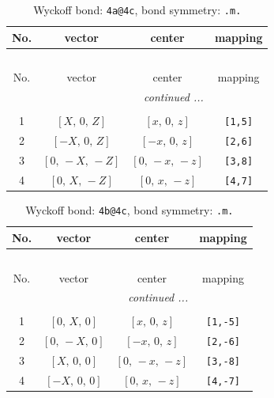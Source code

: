 \documentclass[fleqn,8pt]{jsarticle}
\begin{document}
\begin{longtable}{cccc}
\caption{Wyckoff bond: {\tt 4a@4c}, bond symmetry: {\tt .m.}}
 \\
 \hline \hline
No. & vector & center & mapping \\ \hline \endfirsthead

\multicolumn{3}{l}{\tablename\ \thetable{}} \\
 \hline \hline
No. & vector & center & mapping \\ \hline \endhead

 \hline \hline
\multicolumn{3}{r}{\footnotesize\it continued ...} \\ \endfoot

 \hline \hline
\multicolumn{3}{r}{} \\ \endlastfoot

1 & $\left[ X,\, 0,\, Z \right]$ & $\left[ x,\, 0,\, z \right]$ & {\tt [1,5]} \\ \hline
2 & $\left[ - X,\, 0,\, Z \right]$ & $\left[ - x,\, 0,\, z \right]$ & {\tt [2,6]} \\ \hline
3 & $\left[ 0,\, - X,\, - Z \right]$ & $\left[ 0,\, - x,\, - z \right]$ & {\tt [3,8]} \\ \hline
4 & $\left[ 0,\, X,\, - Z \right]$ & $\left[ 0,\, x,\, - z \right]$ & {\tt [4,7]} \\
\end{longtable}
\renewcommand{\arraystretch}{1.2}
\begin{longtable}{cccc}
\caption{Wyckoff bond: {\tt 4b@4c}, bond symmetry: {\tt .m.}}
 \\
 \hline \hline
No. & vector & center & mapping \\ \hline \endfirsthead

\multicolumn{3}{l}{\tablename\ \thetable{}} \\
 \hline \hline
No. & vector & center & mapping \\ \hline \endhead

 \hline \hline
\multicolumn{3}{r}{\footnotesize\it continued ...} \\ \endfoot

 \hline \hline
\multicolumn{3}{r}{} \\ \endlastfoot

1 & $\left[ 0,\, X,\, 0 \right]$ & $\left[ x,\, 0,\, z \right]$ & {\tt [1,-5]} \\ \hline
2 & $\left[ 0,\, - X,\, 0 \right]$ & $\left[ - x,\, 0,\, z \right]$ & {\tt [2,-6]} \\ \hline
3 & $\left[ X,\, 0,\, 0 \right]$ & $\left[ 0,\, - x,\, - z \right]$ & {\tt [3,-8]} \\ \hline
4 & $\left[ - X,\, 0,\, 0 \right]$ & $\left[ 0,\, x,\, - z \right]$ & {\tt [4,-7]} \\
\end{longtable}
\end{document}
